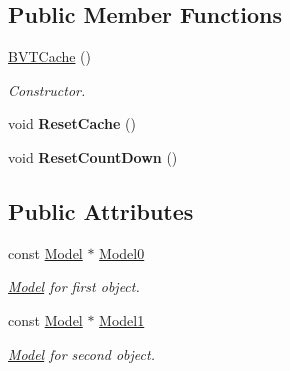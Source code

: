 \subsection*{Public Member Functions}
\begin{DoxyCompactItemize}
\item 
\hyperlink{structOpcode_1_1BVTCache_a064e447850ccddf54288211c1423eef5}{B\+V\+T\+Cache} ()\hypertarget{structOpcode_1_1BVTCache_a064e447850ccddf54288211c1423eef5}{}\label{structOpcode_1_1BVTCache_a064e447850ccddf54288211c1423eef5}

\begin{DoxyCompactList}\small\item\em Constructor. \end{DoxyCompactList}\item 
void {\bfseries Reset\+Cache} ()\hypertarget{structOpcode_1_1BVTCache_ab3ac638549f4af01a62f1aa82c25210b}{}\label{structOpcode_1_1BVTCache_ab3ac638549f4af01a62f1aa82c25210b}

\item 
void {\bfseries Reset\+Count\+Down} ()\hypertarget{structOpcode_1_1BVTCache_a5e09b031c97779ecd759aa96e7c56baa}{}\label{structOpcode_1_1BVTCache_a5e09b031c97779ecd759aa96e7c56baa}

\end{DoxyCompactItemize}
\subsection*{Public Attributes}
\begin{DoxyCompactItemize}
\item 
const \hyperlink{classOpcode_1_1Model}{Model} $\ast$ \hyperlink{structOpcode_1_1BVTCache_a623b0e8df04b74c6b8f73ae670a3cada}{Model0}\hypertarget{structOpcode_1_1BVTCache_a623b0e8df04b74c6b8f73ae670a3cada}{}\label{structOpcode_1_1BVTCache_a623b0e8df04b74c6b8f73ae670a3cada}

\begin{DoxyCompactList}\small\item\em \hyperlink{classOpcode_1_1Model}{Model} for first object. \end{DoxyCompactList}\item 
const \hyperlink{classOpcode_1_1Model}{Model} $\ast$ \hyperlink{structOpcode_1_1BVTCache_ac75edb1f1715bce42a62ae31c5053a7b}{Model1}\hypertarget{structOpcode_1_1BVTCache_ac75edb1f1715bce42a62ae31c5053a7b}{}\label{structOpcode_1_1BVTCache_ac75edb1f1715bce42a62ae31c5053a7b}

\begin{DoxyCompactList}\small\item\em \hyperlink{classOpcode_1_1Model}{Model} for second object. \end{DoxyCompactList}\end{DoxyCompactItemize}



